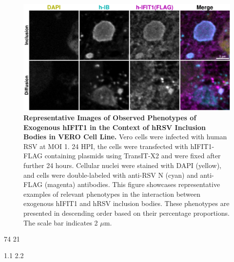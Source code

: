 \begin{figure}
    \centering
    \includegraphics[width=1\linewidth]{09. Chapter 4/Figs/02. Overexpression/01. IFIT1/03. i1-hrsv.pdf}
    \caption[Representative Images of Observed Phenotypes of Exogenous hIFIT1 in the Context of hRSV Inclusion Bodies in VERO Cell Line.]{\textbf{Representative Images of Observed Phenotypes of Exogenous hIFIT1 in the Context of hRSV Inclusion Bodies in VERO Cell Line.} Vero cells were infected with human RSV at MOI 1. 24 HPI, the cells were transfected with hIFIT1-FLAG containing plasmids using TransIT-X2 and were fixed after further 24 hours. Cellular nuclei were stained with DAPI (yellow), and cells were double-labeled with anti-RSV N (cyan) and anti-FLAG (magenta) antibodies. This figure showcases representative examples of relevant phenotypes in the interaction between exogenous hIFIT1 and hRSV inclusion bodies. These phenotypes are presented in descending order based on their percentage proportions. The scale bar indicates 2 \(\mu \mbox{m}\).}
    \label{fig:Representative Images of Observed Phenotypes of Exogenous hIFIT1 in the Context of hRSV Inclusion Bodies in VERO Cell Line}
\end{figure}

74 21

1.1 2.2

